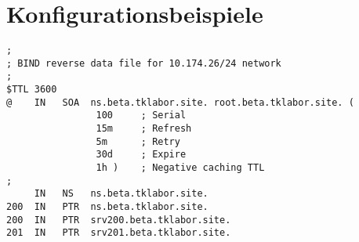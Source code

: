 \section{Konfigurationsbeispiele}
\begin{scriptsize}\label{cfg:bind-reverse-lookup}
\begin{lstlisting}
;
; BIND reverse data file for 10.174.26/24 network
;
$TTL 3600
@    IN   SOA  ns.beta.tklabor.site. root.beta.tklabor.site. (
                100     ; Serial
                15m     ; Refresh
                5m      ; Retry
                30d     ; Expire
                1h )    ; Negative caching TTL
;
     IN   NS   ns.beta.tklabor.site.
200  IN   PTR  ns.beta.tklabor.site.
200  IN   PTR  srv200.beta.tklabor.site.
201  IN   PTR  srv201.beta.tklabor.site.
\end{lstlisting}
\end{scriptsize}